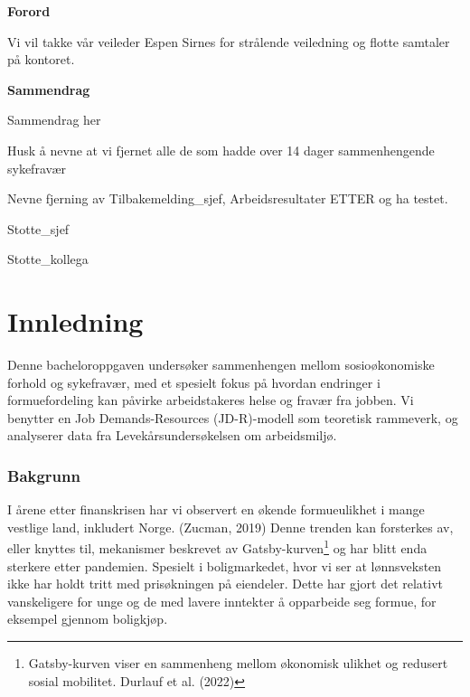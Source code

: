 \documentclass[
  12pt,
  a4paper,
  DIV=11,
  numbers=noendperiod]{scrartcl}
\renewcommand*\contentsname{Table of contents}
\newcommand\contentsname{Table of contents}
\begin{document}




\thispagestyle{plain}
\begin{center}
    \Large
    \textbf{Forord}
\end{center}

Vi vil takke vår veileder Espen Sirnes for strålende veiledning og
flotte samtaler på kontoret.

\newpage
\hypersetup{linkcolor=black}
\renewcommand{\contentsname}{Innholdsfortegnelse}
\renewcommand*{\figureautorefname}{Figur}
\renewcommand*{\tableautorefname}{Tabell}
\renewcommand*{\equationautorefname}{Ligning:}
\tableofcontents
\listoffigures
\listoftables
\hypersetup{linkcolor=blue}
\newpage
\thispagestyle{plain}
\begin{center}
    \Large
    \textbf{Sammendrag}
\end{center}

Sammendrag her

Husk å nevne at vi fjernet alle de som hadde over 14 dager
sammenhengende sykefravær

Nevne fjerning av Tilbakemelding\_sjef, Arbeidsresultater ETTER og ha
testet.

Stotte\_sjef

Stotte\_kollega

\newpage

\section{Innledning}\label{innledning}

Denne bacheloroppgaven undersøker sammenhengen mellom sosioøkonomiske
forhold og sykefravær, med et spesielt fokus på hvordan endringer i
formuefordeling kan påvirke arbeidstakeres helse og fravær fra jobben.
Vi benytter en Job Demands-Resources (JD-R)-modell som teoretisk
rammeverk, og analyserer data fra Levekårsundersøkelsen om arbeidsmiljø.

\subsubsection{Bakgrunn}\label{bakgrunn}

I årene etter finanskrisen har vi observert en økende formueulikhet i
mange vestlige land, inkludert Norge. (Zucman, 2019) Denne trenden kan
forsterkes av, eller knyttes til, mekanismer beskrevet av
Gatsby-kurven\footnote{Gatsby-kurven viser en sammenheng mellom
  økonomisk ulikhet og redusert sosial mobilitet. Durlauf et al. (2022)}
og har blitt enda sterkere etter pandemien. Spesielt i boligmarkedet,
hvor vi ser at lønnsveksten ikke har holdt tritt med prisøkningen på
eiendeler. Dette har gjort det relativt vanskeligere for unge og de med
lavere inntekter å opparbeide seg formue, for eksempel gjennom
boligkjøp.
\end{document}
